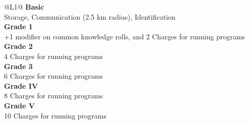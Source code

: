 \begin{redtable}{\linewidth}{@{}L{1}@{}}
  \textbf{Basic} \\
  Storage, Communication (2.5 km radius), Identification \\
  \textbf{Grade 1} \\
  +1 modifier on common knowledge rolls, and 2 Charges for running programs \\
  \textbf{Grade 2} \\
  4 Charges for running programs \\
  \textbf{Grade 3} \\
  6 Charges for running programs \\
  \textbf{Grade IV} \\
  8 Charges for running programs \\
  \textbf{Grade V} \\
  10 Charges for running programs \\
\end{redtable}
